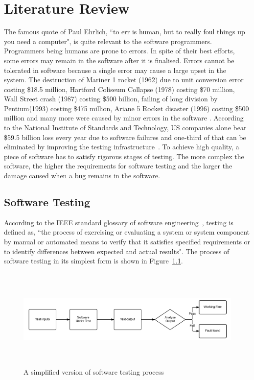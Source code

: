  
\chapter{Literature Review}
\label{chap:softwareTesting}
The famous quote of Paul Ehrlich, ``to err is human, but to really foul things up you need a computer", is quite relevant to the software programmers. Programmers being humans are prone to errors. In spite of their best efforts, some errors may remain in the software after it is finalised.  Errors cannot be tolerated in software because a single error may cause a large upset in the system. The destruction of Mariner 1 rocket (1962) due to unit conversion error costing \$18.5 million, Hartford Coliseum Collapse (1978) costing \$70 million, Wall Street crash (1987) costing \$500 billion, failing of long division by Pentium\texttrademark (1993) costing \$475 million, Ariane 5 Rocket disaster (1996) costing \$500 million and many more were caused by minor errors in the software \cite{garfinkel2005history, toweysoftware}. According to the National Institute of Standards and Technology, US companies alone bear \$59.5 billion loss every year due to software failures and one-third of that can be eliminated by improving the testing infrastructure~\cite{tassey2002economic}. To achieve high quality, a piece of software has to satisfy rigorous stages of testing. The more complex the software, the higher the requirements for software testing and the larger the damage caused when a bug remains in the software.

\section{Software Testing}
According to the IEEE standard glossary of software engineering~\cite{american1984}, testing is defined as, ``the process of exercising or evaluating a system or system component by manual or automated means to verify that it satisfies specified requirements or to identify differences between expected and actual results". The process of software testing in its simplest form is shown in Figure~\ref{fig:softwareTestingParts_2}. 

\begin{figure}[h]
	\centering
	\centerline{\includegraphics[width=16cm, height=5cm]{chapter2/softwareTesting.png}}
	\caption{A simplified version of software testing process}
	\label{fig:softwareTestingParts_2}
\end{figure}

